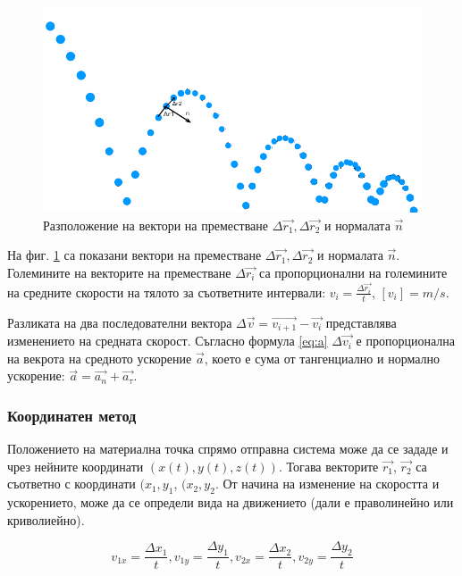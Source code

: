 \documentclass[12pt]{article}
\begin{document}
\begin{figure}
\centering
\includegraphics[width=1\textwidth]{images/vector-analysis.png}
\caption{\label{fig:vector-analysis} Разположение на вектори на преместване \(\Delta \vec{r_1}, \Delta \vec{r_2}\) и нормалата \(\vec{n}\)}
\end{figure}

На фиг. \ref{fig:vector-analysis} са показани вектори на преместване \(\Delta \vec{r_1}, \Delta \vec{r_2}\) и нормалата \(\vec{n}\). Големините на векторите на преместване \(\Delta \vec{r_i}\) са пропорционални на големините на средните скорости на тялото за съответните интервали: \(v_i = \frac{\Delta \vec{r_i}}{t}\), \([v_i] = m/s\). 

Разликата на два последователни вектора \(\Delta \vec{v} = \vec{v_{i+1}} - \vec{v_i}\) представлява изменението на средната скорост. Съгласно формула \ref{eq:a} \(\Delta \vec{v_i}\) е пропорционална на векрота на средното ускорение \(\vec{a}\), което е сума от тангенциално и нормално ускорение: \(\vec{a} = \vec{a_n} + \vec{a_\tau}\).

\subsubsection{Координатен метод}
Положението на материална точка спрямо отправна система може да се зададе и чрез нейните координати \((x(t), y(t), z(t))\). Тогава векторите \(\vec{r_1}\), \(\vec{r_2}\) са съответно с координати \((x_1, y_1\), \((x_2, y_2\). От начина на изменение на скоростта и ускорението, може да се определи вида на движението (дали е праволинейно или криволиейно). 

\begin{equation}\label{eq:v_coordinate_method}
v_{1x} = \frac{\Delta x_1}{t}, v_{1y} = \frac{\Delta y_1}{t},v_{2x} = \frac{\Delta x_2}{t}, v_{2y} = \frac{\Delta y_2}{t}
\end{equation}
\end{document}
